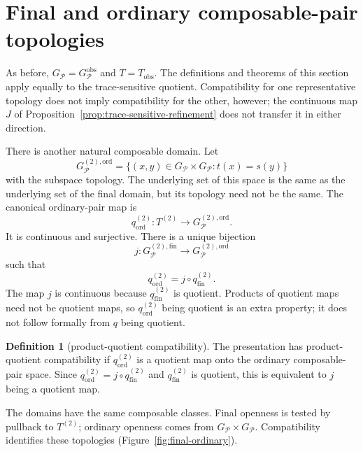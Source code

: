 \documentclass[10pt,reqno]{amsart}
\theoremstyle{definition}
\newtheorem{definition}{Definition}[section]
\theoremstyle{plain}
\theoremstyle{remark}
\newcommand{\Fin}{\mathrm{fin}}
\newcommand{\Ord}{\mathrm{ord}}
\begin{document}
\section{Final and ordinary composable-pair topologies}
\label{sec:final-ordinary}

As before, $G_{\mathcal P}=G_{\mathcal P}^{\mathrm{obs}}$ and
$T=T_{\mathrm{obs}}$.  The definitions and theorems of this section apply
equally to the trace-sensitive quotient.  Compatibility for one
representative topology does not imply compatibility for the other, however;
the continuous map $J$ of Proposition~\ref{prop:trace-sensitive-refinement}
does not transfer it in either direction.

There is another natural composable domain.  Let
\[
  G_{\mathcal P}^{(2),\Ord}
  =\{(x,y)\in G_{\mathcal P}\times G_{\mathcal P}:t(x)=s(y)\}
\]
with the subspace topology.  The underlying set of this space is the same as
the underlying set of the final domain, but its topology need not be the same.
The canonical ordinary-pair map is
\[
  q_{\Ord}^{(2)}:T^{(2)}\longrightarrow G_{\mathcal P}^{(2),\Ord}.
\]
It is continuous and surjective.  There is a unique bijection
\[
  j:G_{\mathcal P}^{(2),\Fin}\longrightarrow G_{\mathcal P}^{(2),\Ord}
\]
such that
\[
  q_{\Ord}^{(2)}=j\circ q_{\Fin}^{(2)}.
\]
The map $j$ is continuous because $q_{\Fin}^{(2)}$ is quotient.  Products of
quotient maps need not be quotient maps, so $q_{\Ord}^{(2)}$ being quotient is
an extra property; it does not follow formally from $q$ being quotient.

\begin{definition}[product-quotient compatibility]
The presentation has product-quotient compatibility if $q_{\Ord}^{(2)}$ is a
quotient map onto the ordinary composable-pair space.  Since
$q_{\Ord}^{(2)}=j\circ q_{\Fin}^{(2)}$ and $q_{\Fin}^{(2)}$ is quotient, this
is equivalent to $j$ being a quotient map.
\end{definition}

The domains have the same composable classes. Final openness is tested by
pullback to $T^{(2)}$; ordinary openness comes from $G_{\mathcal P}\times G_{\mathcal P}$.
Compatibility identifies these topologies (Figure~\ref{fig:final-ordinary}).
\end{document}
